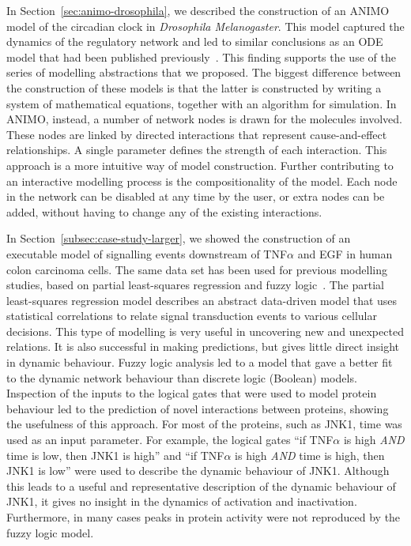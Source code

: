 In Section~\ref{sec:animo-drosophila}, we described the construction of an ANIMO
model of the circadian clock in \emph{Drosophila Melanogaster}. This model
captured the dynamics of the regulatory network and led to similar 
conclusions as an ODE model that had been
published previously~\citep{drosophila-ode-model}. This finding supports the use of
the series of modelling abstractions that we proposed. The biggest
difference between the construction of these models is that the latter
is constructed by writing a system of mathematical equations, together
with an algorithm for simulation. In ANIMO, instead, a number of network
nodes is drawn for the molecules involved. These nodes are linked by directed
interactions that represent cause-and-effect relationships. 
A single parameter defines the strength of each
interaction. This approach is a more intuitive way of model
construction. Further contributing to an interactive modelling process
is the compositionality of the model. Each node in the network
can be disabled at any time by the user, or extra nodes can be added,
without having to change any of the existing interactions.

In Section~\ref{subsec:case-study-larger}, we showed the construction of an executable model
of signalling events downstream of
TNF$\alpha$ and EGF in human colon carcinoma cells. The same data set has been used for
previous modelling studies, based on partial least-squares regression and fuzzy logic~\citep{pathway-leastsquare,pathway-fuzzy}.
The partial least-squares regression model describes an abstract data-driven model that uses statistical correlations
to relate signal transduction events to various cellular decisions. This type of modelling is
very useful in uncovering new and unexpected relations. It is also successful in making
predictions, but gives little direct insight in dynamic behaviour. Fuzzy
logic analysis led to a model that gave a better fit to the dynamic network behaviour than
discrete logic (Boolean) models. Inspection of the inputs to the logical gates that were used
to model protein behaviour led to the prediction of novel interactions between proteins,
showing the usefulness of this approach. For most of the proteins, such as JNK1, time was
used as an input parameter. For example, the logical gates ``if TNF$\alpha$ is high
\emph{AND} time is low, then JNK1 is high'' and ``if TNF$\alpha$ is high \emph{AND} time is
high, then JNK1 is low'' were used to
describe the dynamic behaviour of JNK1. Although this leads to a useful and representative
description of the dynamic behaviour of JNK1, it gives no insight in the dynamics
of activation and inactivation. Furthermore, in many cases peaks in protein activity were
not reproduced by the fuzzy logic model.

